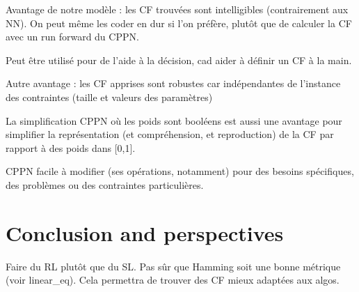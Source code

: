 \documentclass[letterpaper]{article} %
\begin{document}
Avantage de notre modèle : les CF trouvées sont intelligibles (contrairement aux NN). On peut même les coder en dur si l'on préfère, plutôt que de calculer la CF avec un run forward du CPPN.

Peut être utilisé pour de l'aide à la décision, cad aider à définir un CF à la main. 

Autre avantage : les CF apprises sont robustes car indépendantes de l'instance des contraintes (taille et valeurs des paramètres)

La simplification CPPN où les poids sont booléens est aussi une avantage pour simplifier la représentation (et compréhension, et reproduction) de la CF par rapport à des poids dans [0,1].

CPPN facile à modifier (ses opérations, notamment) pour des besoins spécifiques, des problèmes ou des contraintes particulières.


\section{Conclusion and perspectives}\label{sec:conclusion}

Faire du RL plutôt que du SL. Pas sûr que Hamming soit une bonne métrique (voir linear\_eq). Cela permettra de trouver des CF mieux adaptées aux algos.


%


\end{document}
